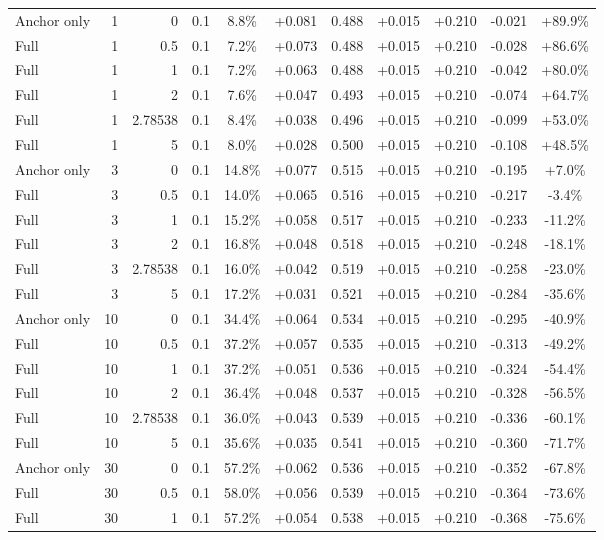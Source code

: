 \begin{table}[htbp]
\begin{tabular}{lrrrccccccc}
Anchor only & 1 & 0 & 0.1 & 8.8\% & +0.081 & 0.488 & +0.015 & +0.210 & -0.021 & +89.9\% \\
Full & 1 & 0.5 & 0.1 & 7.2\% & +0.073 & 0.488 & +0.015 & +0.210 & -0.028 & +86.6\% \\
Full & 1 & 1 & 0.1 & 7.2\% & +0.063 & 0.488 & +0.015 & +0.210 & -0.042 & +80.0\% \\
Full & 1 & 2 & 0.1 & 7.6\% & +0.047 & 0.493 & +0.015 & +0.210 & -0.074 & +64.7\% \\
Full & 1 & 2.78538 & 0.1 & 8.4\% & +0.038 & 0.496 & +0.015 & +0.210 & -0.099 & +53.0\% \\
Full & 1 & 5 & 0.1 & 8.0\% & +0.028 & 0.500 & +0.015 & +0.210 & -0.108 & +48.5\% \\
Anchor only & 3 & 0 & 0.1 & 14.8\% & +0.077 & 0.515 & +0.015 & +0.210 & -0.195 & +7.0\% \\
Full & 3 & 0.5 & 0.1 & 14.0\% & +0.065 & 0.516 & +0.015 & +0.210 & -0.217 & -3.4\% \\
Full & 3 & 1 & 0.1 & 15.2\% & +0.058 & 0.517 & +0.015 & +0.210 & -0.233 & -11.2\% \\
Full & 3 & 2 & 0.1 & 16.8\% & +0.048 & 0.518 & +0.015 & +0.210 & -0.248 & -18.1\% \\
Full & 3 & 2.78538 & 0.1 & 16.0\% & +0.042 & 0.519 & +0.015 & +0.210 & -0.258 & -23.0\% \\
Full & 3 & 5 & 0.1 & 17.2\% & +0.031 & 0.521 & +0.015 & +0.210 & -0.284 & -35.6\% \\
Anchor only & 10 & 0 & 0.1 & 34.4\% & +0.064 & 0.534 & +0.015 & +0.210 & -0.295 & -40.9\% \\
Full & 10 & 0.5 & 0.1 & 37.2\% & +0.057 & 0.535 & +0.015 & +0.210 & -0.313 & -49.2\% \\
Full & 10 & 1 & 0.1 & 37.2\% & +0.051 & 0.536 & +0.015 & +0.210 & -0.324 & -54.4\% \\
Full & 10 & 2 & 0.1 & 36.4\% & +0.048 & 0.537 & +0.015 & +0.210 & -0.328 & -56.5\% \\
Full & 10 & 2.78538 & 0.1 & 36.0\% & +0.043 & 0.539 & +0.015 & +0.210 & -0.336 & -60.1\% \\
Full & 10 & 5 & 0.1 & 35.6\% & +0.035 & 0.541 & +0.015 & +0.210 & -0.360 & -71.7\% \\
Anchor only & 30 & 0 & 0.1 & 57.2\% & +0.062 & 0.536 & +0.015 & +0.210 & -0.352 & -67.8\% \\
Full & 30 & 0.5 & 0.1 & 58.0\% & +0.056 & 0.539 & +0.015 & +0.210 & -0.364 & -73.6\% \\
Full & 30 & 1 & 0.1 & 57.2\% & +0.054 & 0.538 & +0.015 & +0.210 & -0.368 & -75.6\% \\

\end{tabular}
\end{table}
